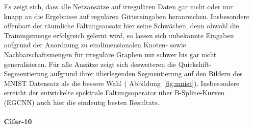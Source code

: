 Es zeigt sich, dass alle Netzansätze auf irregulären Daten gar nicht oder nur knapp an die Ergebnisse auf regulären Gittereingaben heranreichen.
Insbesondere offenbart der räumliche Faltungsansatz hier seine Schwächen, denn obwohl die Trainingsmenge erfolgreich gelernt wird, so lassen sich unbekannte Eingaben aufgrund der Anordnung zu eindimensionalen Knoten- sowie Nachbarschaftsmengen für irreguläre Graphen nur schwer bis gar nicht generalisieren.
Für alle Ansätze zeigt sich desweiteren die Quickshift-Segmentierung aufgrund ihrer überlegenden Segmentierung auf den Bildern des \gls{MNIST} Datensatz als die bessere Wahl (\vgl{} Abbildung~\ref{fig:mnist}).
Insbesondere erreicht der entwickelte spektrale Faltungsoperator über B-Spline-Kurven (\acs{EGCNN}) auch hier die eindeutig besten Resultate.

\paragraph{\gls{Cifar}-10}

